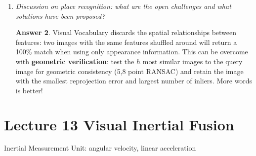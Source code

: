 \documentclass[a4paper,12 pt]{article}
\theoremstyle{definition}
\theoremstyle{remark}
\theoremstyle{definition}
\theoremstyle{definition}
\theoremstyle{definition}
\theoremstyle{definition}
\theoremstyle{remark}
\theoremstyle{remark}
\theoremstyle{definition}
\theoremstyle{definition}
\newtheorem*{answer}{Answer}
\begin{document}
\begin{enumerate}
\begin{answer}
\begin{figure}[h!]
\begin{center}
\caption{Bag-of-Words Retrieval. \label{fig:Bow}}
\end{center}
\end{figure}
\end{answer}
\item \textit{Discussion on place recognition: what are the open challenges and what solutions have been proposed?}
\begin{answer}
Visual Vocabulary discards the spatial relationships between features: two images with the same features shuffled around will return a 100\% match when using only appearance information. This can be overcome with \textbf{geometric verification}: test the $h$ most similar images to the query image for geometric consistency (5,8 point RANSAC) and retain the image with the smallest reprojection error and largest number of inliers. More words is better!
\end{answer}
\end{enumerate}
\newpage
\section*{Lecture 13 Visual Inertial Fusion}
Inertial Measurement Unit: angular velocity, linear acceleration\\
\end{document}

